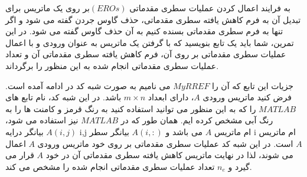 \documentclass{article}
\begin{document}
به فرایند اعمال کردن عملیات سطری مقدماتی $(EROs) $بر روی یک ماتریس برای تبدیل آن به فرم کاهش یافته سطری مقدماتی، حذف گاوس جردن گفته می شود و اگر تنها به فرم سطری مقدماتی بسنده کنیم به آن حذف گاوس گفته می شود.
در این تمرین، شما باید یک تابع بنویسید که با گرفتن یک ماتریس به عنوان ورودی و با اعمال عملیات سطری مقدماتی بر روی آن، فرم کاهش یافته سطری مقدماتی آن و تعداد عملیات سطری مقدماتی انجام شده به این منظور را برگرداند.

جزیات این تابع که آن را $ MyRREF$ می نامیم به صورت شبه کد در ادامه آمده است. فرض کنید ماتریس ورودی $A$، دارای ابعداد $m \times n$ باشد.
در این شبه کد، نام تابع های $MATLAB$ را که به این منظور می توانید استفاده کنید به رنگ قرمز و کامنت ها را به رنگ آبی مشخص کرده ایم.
همان طور که در $MATLAB$  نیز استفاده می شود،  
$A(i,j)$
  بیانگر درایه i,j ام ماتریس $A$ می باشد و 
$A(i,:)$
    بیانگر سطر i ام ماتریس $A$ است. در این شبه کد عملیات سطری مقدماتی بر روی خود ماتریس ورودی  $A$ اعمال می شوند، لذا در نهایت ماتریس کاهش یافته سطری مقدماتی آن در خود $A$ قرار می گیرد و $n_e$ تعداد عملیات سطری مقدماتی انجام شده را مشخص می کند.
\end{document}
